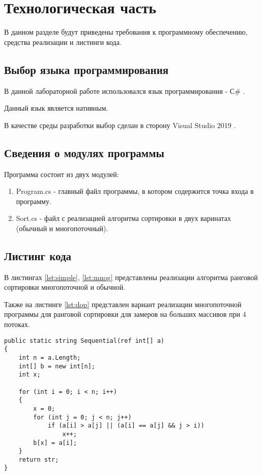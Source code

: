 \chapter{Технологическая часть}
В данном разделе будут приведены требования к программному обеспечению, средства реализации и листинги кода.

\section{Выбор языка программирования}

В данной лабораторной работе использовался язык программирования - С\# \cite{csharplang}.

Данный язык является нативным.

В качестве среды разработки выбор сделан в сторону Visual Studio 2019 \cite{wind}. 

\section{Сведения о модулях программы}
Программа состоит из двух модулей:
\begin{enumerate}
	\item Program.cs - главный файл программы, в котором содержится точка входа в программу.
	\item Sort.cs - файл с реализацией алгоритма сортировки в двух варинатах (обычный и многопоточный).
\end{enumerate}

\section{Листинг кода}
В листингах \ref{lst:simple}, \ref{lst:mnog} представлены реализации алгоритма ранговой сортировки многопоточной и обычной.

Также на листинге \ref{lst:dop} представлен вариант реализации многопоточной программы для ранговой сортировки для замеров на больших массивов при 4 потоках.

\begin{lstlisting}[label=lst:simple,caption=Алгоритм ранговой сортировки (обычный)]
public static string Sequential(ref int[] a)
{
	int n = a.Length;
	int[] b = new int[n];
	int x;

	for (int i = 0; i < n; i++)
	{
		x = 0;
		for (int j = 0; j < n; j++)
			if (a[i] > a[j] || (a[i] == a[j] && j > i))
				x++;
		b[x] = a[i]; 
	}
	return str;
}
\end{lstlisting}


